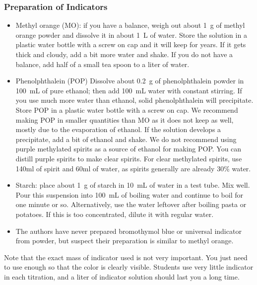 \subsubsection{Preparation of Indicators} 
\begin{itemize}

\item{Methyl orange (MO): if you have a balance, weigh out about 1~g of methyl orange powder and dissolve it in about 1~L of water. Store the solution in a 
plastic water bottle with a screw on cap and it will keep for years. If it gets thick and cloudy, add a bit more water and shake. If you do not have a balance, add half of a small tea spoon to a liter of water.}

\item{Phenolphthalein (POP) Dissolve about 0.2~g of phenolphthalein powder in 100~mL of pure ethanol; then add 100~mL water with constant stirring. If you use 
much more water than ethanol, solid phenolphthalein will precipitate. Store POP in a plastic water bottle with a screw on cap. We recommend making POP in smaller quantities than MO as it does not keep as well, mostly due to the evaporation of ethanol. If the solution develops a precipitate, add a bit of ethanol and shake. We do not recommend using purple methylated spirits as a source of ethanol for making POP. You can distill purple spirits to make clear spirits. For clear methylated spirits, use 140ml of spirit and 60ml of water, as spirits generally are already 30\% water.}

\item{Starch: place about 1~g of starch in 10~mL of water in a test tube. Mix well. Pour this suspension into 100~mL of boiling water and continue to boil for 
one minute or so. Alternatively, use the water leftover after boiling pasta or potatoes. If this is too concentrated, dilute it with regular water.}

\item{The authors have never prepared bromothymol blue or universal indicator from powder, but suspect their preparation is similar to methyl orange.}

\end{itemize}

Note that the exact mass of indicator used is not very important. You just need to use enough so that the color is clearly visible. Students use very little indicator in each titration, and a liter of indicator solution should last you a long time.

